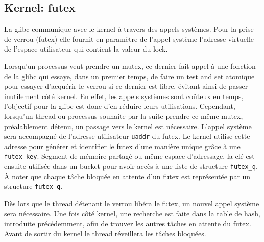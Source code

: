 \subsection{Kernel: futex}

La glibc communique avec le kernel à travers des appels systèmes. Pour la prise de verrou (futex) elle fournit en paramètre de l'appel système l'adresse virtuelle de l'espace utilisateur qui contient la valeur du lock.

Lorsqu'un processus veut prendre un mutex, ce dernier fait appel à une fonction 
de la glibc qui essaye, dans un premier temps, de faire un test and set atomique pour essayer d'acquérir le verrou si ce dernier est libre, évitant ainsi de passer inutilement côté kernel. En effet, les appels systèmes sont coûteux en temps, l'objectif pour la glibc est donc d'en réduire leurs utilisations. Cependant, lorsqu'un thread ou processus souhaite par la suite prendre ce même mutex, préalablement détenu, un passage vers le kernel est nécessaire. L'appel système sera accompagné de l'adresse utilisateur \verb|uaddr| du futex. Le kernel utilise cette adresse pour générer et identifier le futex d'une manière unique grâce à une \verb|futex_key|. Segment de mémoire partagé ou même espace d'adressage, la clé est ensuite utilisée dans un bucket pour avoir accès à une liste de structure \verb|futex_q|. À noter que chaque tâche bloquée en attente d'un futex est représentée par un structure \verb|futex_q|.

Dès lors que le thread détenant le verrou libéra le futex, un nouvel appel système sera nécessaire. Une fois côté kernel, une recherche est faite dans la table de hash, introduite précédemment, afin de trouver les autres tâches en attente du futex. Avant de sortir du kernel le thread réveillera les tâches bloquées.
\\

